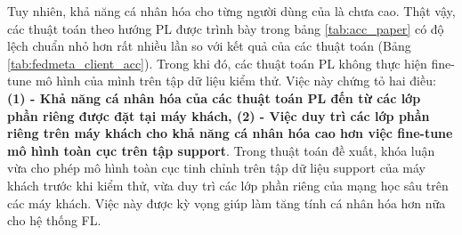 Tuy nhiên, khả năng cá nhân hóa cho từng người dùng của  là chưa cao. Thật vậy, các thuật toán theo hướng PL được trình bày trong bảng \ref{tab:acc_paper} có độ lệch chuẩn nhỏ hơn rất nhiều lần so với kết quả của các thuật toán  (Bảng \ref{tab:fedmeta_client_acc}). Trong khi đó, các thuật toán PL không thực hiện fine-tune mô hình của mình trên tập dữ liệu kiểm thử. Việc này chứng tỏ hai điều: \textbf{(1) - Khả năng cá nhân hóa của các thuật toán PL đến từ các lớp phần riêng được đặt tại máy khách, (2) - Việc duy trì các lớp phần riêng trên máy khách cho khả năng cá nhân hóa cao hơn việc fine-tune mô hình toàn cục trên tập support}. Trong thuật toán đề xuất, khóa luận vừa cho phép mô hình toàn cục tinh chỉnh trên tập dữ liệu support của máy khách trước khi kiểm thử, vừa duy trì các lớp phần riêng của mạng học sâu trên các máy khách. Việc này được kỳ vọng giúp làm tăng tính cá nhân hóa hơn nữa cho hệ thống FL.

\begin{table}
    \centering
    \caption{Bảng độ chính xác (\%) của thuật toán FedAvg và các thuật toán FedMeta tính trên máy khách (dữ liệu Non-IID)}
    \label{tab:fedmeta_client_acc}
\end{table}

